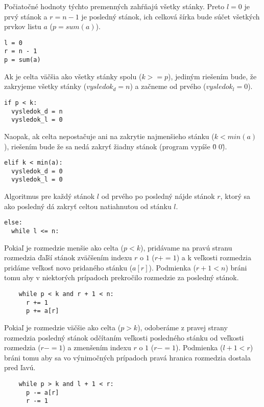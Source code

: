 \documentclass{article}
\begin{document}
Počiatočné hodnoty týchto premenných zahŕňajú všetky stánky. Preto $l = 0$ je prvý stánok a $r = n - 1$ je posledný stánok, ich celková šírka bude súčet všetkých prvkov listu $a$ ($p = sum(a)$).

\begin{verbatim}
l = 0
r = n - 1
p = sum(a)
\end{verbatim}

Ak je celta väčšia ako všetky stánky spolu ($k >= p$), jediným riešením bude, že zakryjeme všetky stánky ($vysledok_d = n$) a začneme od prvého ($vysledok_l = 0$).

\begin{verbatim}
if p < k:
  vysledok_d = n
  vysledok_l = 0
\end{verbatim}

Naopak, ak celta nepostačuje ani na zakrytie najmenšieho stánku ($k < min(a)$), riešením bude že sa nedá zakryť žiadny stánok (program vypíše \"0 0\").

\begin{verbatim}
elif k < min(a):
  vysledok_d = 0
  vysledok_l = 0
\end{verbatim}

Algoritmus pre každý stánok $l$ od prvého po posledný nájde stánok $r$, ktorý sa ako posledný dá zakryť celtou natiahnutou od stánku $l$.

\begin{verbatim}
else:
  while l <= n:
\end{verbatim}

Pokiaľ je rozmedzie menšie ako celta ($p < k$), pridávame na pravú stranu rozmedzia ďaľší stánok zväčšením indexu $r$ o $1$ ($r += 1$) a k veľkosti rozmedzia pridáme veľkosť novo pridaného stánku ($a[r]$).
Podmienka ($r + 1 < n$) bráni tomu aby v niektorých prípadoch prekročilo rozmedzie za posledný stánok.

\begin{verbatim}
    while p < k and r + 1 < n:
      r += 1
      p += a[r]
\end{verbatim}

Pokiaľ je rozmedzie väčšie ako celta ($p > k$), odoberáme z pravej strany rozmedzia posledný stánok odčítaním veľkosti posledného stánku od veľkosti rozmedzia ($r -= 1$) a zmenšením indexu $r$ o $1$ ($r -= 1$).
Podmienka ($l + 1 < r$) bráni tomu aby sa vo výnimočných prípadoch pravá hranica rozmedzia dostala pred ľavú.

\begin{verbatim}
    while p > k and l + 1 < r:
      p -= a[r]
      r -= 1
\end{verbatim}
\end{document}

